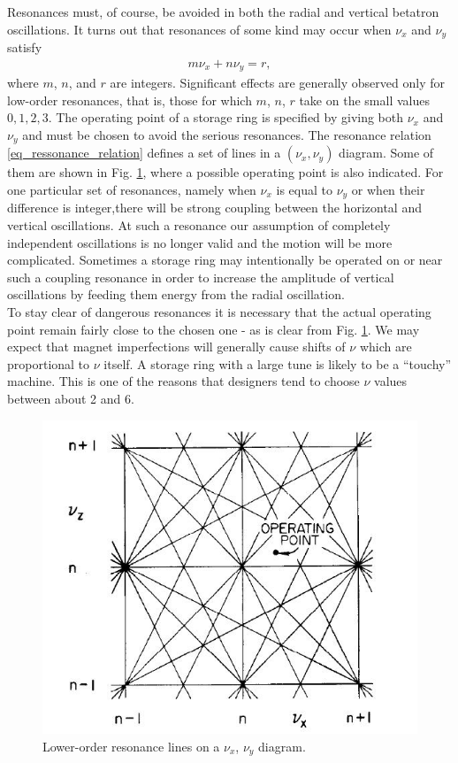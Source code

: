 Resonances must, of course, be avoided in both the radial and vertical betatron oscillations. It turns out that resonances of some kind may occur when $\nu_x$ and $\nu_y$ satisfy
\begin{align}\label{eq_ressonance_relation}
	m \nu_x + n \nu_y = r,
\end{align}
where $m$, $n$, and $r$ are integers. Significant effects are generally observed only for low-order resonances, that is, those for which $m$, $n$, $r$ take on the small values $0, 1, 2, 3$. The operating point of a storage ring is specified by giving both $\nu_x$
and $\nu_y$ and must be chosen to avoid the serious resonances. The resonance relation \eqref{eq_ressonance_relation} defines a set of lines in a $(\nu_x, \nu_y)$ diagram. Some of them are shown in Fig. \ref{fig:lower_order_resonance_lines}, where a possible operating point is also indicated. For one particular set of resonances, namely when $\nu_x$ is equal to $\nu_y$ or when their difference is integer,there will be strong coupling between the horizontal and vertical oscillations. At such a resonance our assumption of completely independent oscillations is no longer valid and the motion will be more complicated. Sometimes a storage ring may intentionally be operated on or near such a coupling resonance in order to increase the amplitude of vertical oscillations by feeding them energy from the radial oscillation. \\
To stay clear of dangerous resonances it is necessary that the actual operating point remain fairly close to the chosen one - as is clear from Fig. \ref{fig:lower_order_resonance_lines}. We may expect that magnet imperfections will generally cause shifts of $\nu$ which are proportional to $\nu$ itself. A storage ring with a large tune is likely to be a “touchy” machine. This is one of the reasons that designers tend to choose $\nu$ values between about 2 and 6.

\begin{figure}[!htb]
	\centering
	\includegraphics[width=0.7\linewidth]{./Figuras/fig14.jpeg}
	\caption{Lower-order resonance lines on a $\nu_x$, $\nu_y$ diagram.}
	\label{fig:lower_order_resonance_lines}
\end{figure}
